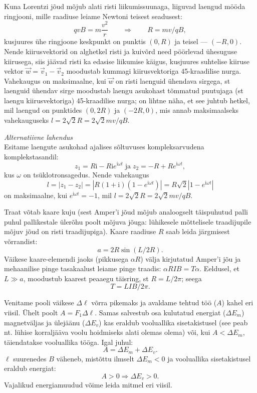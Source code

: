 \documentclass[10pt, twoside]{article}
\begin{document}
{
\solu
Kuna Lorentzi jõud mõjub alati risti liikumissuunaga, liiguvad laengud mööda ringjooni, mille raadiuse leiame Newtoni teisest seadusest:
\[
qvB=m\frac{v^2}{r} \qquad \Rightarrow \qquad R=mv/qB,
\]
kusjuures ühe ringjoone keskpunkt on punktis $(0,R)$ ja teisel --- $(-R,0)$.
Nende kiirusvektorid on alghetkel risti ja kuivõrd need pöörlevad ühesuguse kiirusega, siis jäävad risti ka edasise liikumise käigus,
kusjuures suhtelise kiiruse vektor $\vec w= \vec v_1-\vec v_2$ moodustab kummagi kiirusvektoriga 45-kraadilise nurga. Vahekaugus on
maksimaalne, kui $\vec w$ on risti laenguid ühendava sirgega, st laenguid ühendav sirge moodustab laengu asukohast tõmmatud
puutujaga (st laengu kiirusvektoriga) 45-kraadilise nurga; on lihtne näha, et see juhtub hetkel, mil laengud on punktides $(0,2R)$ ja $(-2R,0)$, mis
annab maksimaalseks vahekauguseks $l=2\sqrt 2 R =2\sqrt 2mv/qB$.

\vspace{0.5\baselineskip}

{\em Alternatiivne lahendus}\\
Esitame laengute asukohad ajalises sõltuvuses kompleksarvudena komplekstasandil:
$$z_1=R\mathrm{i} - R\mathrm{i}e^{\mathrm{i}\omega t}\;\mbox{ja}\; z_2= -R + Re^{\mathrm{i}\omega t},$$ kus
$\omega$ on tsüklotronsagedus. Nende vahekaugus
$$l=|z_1-z_2|=|R(1+\mathrm{i})(1-e^{\mathrm{i}\omega t})|=R\sqrt 2|1-e^{\mathrm{i}\omega t}|$$ on maksimaalne, kui $e^{\mathrm{i}\omega t}=-1$, mil $l=2\sqrt{2}R=2\sqrt{2}mv/qB$.
\probend
\bigskip


\solu
Traat võtab kaare kuju (sest Amper’i jõud mõjub analoogselt täispuhutud palli puhul pallikestale ülerõhu poolt mõjuva jõuga: lühikesele mõttelisele traadijupile mõjuv jõud on risti traadijupiga). Kaare raadiuse $R$ saab leida järgmisest võrrandist:
\[
a = 2R \sin (L/2R).
\]
Väikese kaare-elemendi jaoks (pikkusega $\alpha R$) välja kirjutatud Amper’i jõu ja mehaanilise pinge tasakaalust leiame pinge traadis: $\alpha RIB = T \alpha$. Eeldusel, et $L \gg a$, moodustub kaarest peaaegu täisring, st $R = L/2\pi$; seega
\[
T = LIB/2\pi.
\]
\probend
\bigskip


\solu
Venitame pooli väikese $\Delta \ell$ võrra pikemaks ja avaldame tehtud töö ($A$) kahel eri viisil. Ühelt poolt $A = F_1\Delta \ell$. Samas salvestub osa kulutatud energiat ($\Delta E_m$) magnetväljas ja ülejäänu ($\Delta E_v$) kas eraldub vooluallika sisetakistusel (see peab nt. lühise korraljääva voolu hoidmiseks alati olemas olema) või, kui $A < \Delta E_m$, täiendatakse vooluallika tööga. Igal juhul:
\[
A = \Delta E_m + \Delta E_v.
\]
$\ell$ suurenedes $B$ väheneb, mistõttu ilmselt $\Delta E_m < 0$ ja vooluallika sisetakistusel eraldub energiat:
\[
A > 0 \Longrightarrow \Delta E_v > 0.
\]
Vajalikud energiamuudud võime leida mitmel eri viisil.

}
\end{document}
